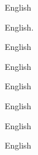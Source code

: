 \clearpage		%
\question{}

\listbeginx	%

	\item English  
	
		
		\listbegin

\item English.

		

\item English  


	\item English	
	



	\item English 		


		
		\listclose


	

	
	\item English 
	
	

\listbegin

	\item English   
	


    \item English   
	


\listclose


\listclose	%
